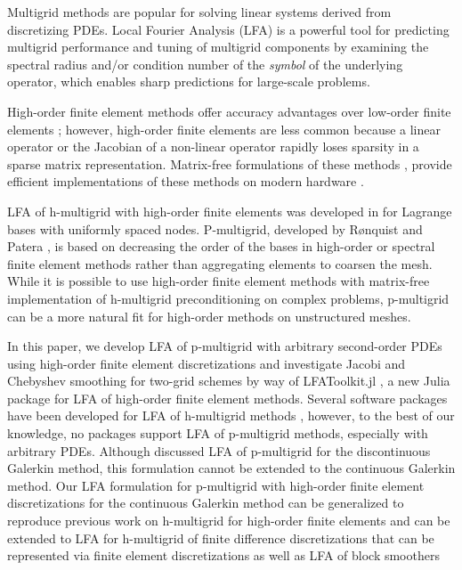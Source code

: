 \documentclass[review]{siamart190516}
\begin{document}
Multigrid methods \cite{brandt1982guide, briggs2000multigrid, stuben1982multigrid} are popular for solving linear systems derived from discretizing PDEs.
Local Fourier Analysis (LFA) \cite{brandt1977multi, wienands2004practical} is a powerful tool for predicting multigrid performance and tuning of multigrid components by examining the spectral radius and/or condition number of the {\em{symbol}} of the underlying operator, which enables sharp predictions for large-scale problems.

High-order finite element methods offer accuracy advantages over low-order finite elements \cite{demkowicz1989toward, oden1989toward, rachowicz1989toward}; however, high-order finite elements are less common because a linear operator or the Jacobian of a non-linear operator rapidly loses sparsity in a sparse matrix representation.
Matrix-free formulations of these methods \cite{brown2010efficient, deville2002highorder, knoll2004jacobian}, provide efficient implementations of these methods on modern hardware \cite{libceed-user-manual, fischer2020scalability, kronbichler2019multigrid}.

LFA of h-multigrid with high-order finite elements was developed in \cite{he2020two} for Lagrange bases with uniformly spaced nodes.
P-multigrid, developed by R{\o}nquist and Patera \cite{ronquist1987spectral}, is based on decreasing the order of the bases in high-order or spectral finite element methods rather than aggregating elements to coarsen the mesh.
While it is possible \cite{davydov2019matrix} to use high-order finite element methods with matrix-free implementation of h-multigrid preconditioning on complex problems, p-multigrid can be a more natural fit for high-order methods on unstructured meshes.

In this paper, we develop LFA of p-multigrid with arbitrary second-order PDEs using high-order finite element discretizations and investigate Jacobi and Chebyshev smoothing for two-grid schemes by way of LFAToolkit.jl \cite{thompson2021toolkit}, a new Julia package for LFA of high-order finite element methods.
Several software packages have been developed for LFA of h-multigrid methods \cite{rittich2018extending,kahl2020automated,wienands2004practical}, however, to the best of our knowledge, no packages support LFA of p-multigrid methods, especially with arbitrary PDEs.
Although \cite{van2011discrete} discussed LFA of p-multigrid for the discontinuous Galerkin method, this formulation cannot be extended to the continuous Galerkin method.
Our LFA formulation for p-multigrid with high-order finite element discretizations for the continuous Galerkin method can be generalized to reproduce previous work on h-multigrid for high-order finite elements \cite{he2020two} and can be extended to LFA for h-multigrid of finite difference discretizations that can be represented via finite element discretizations as well as LFA of block smoothers \cite{maclachlan2011overlapping,brown2019local}
\end{document}
